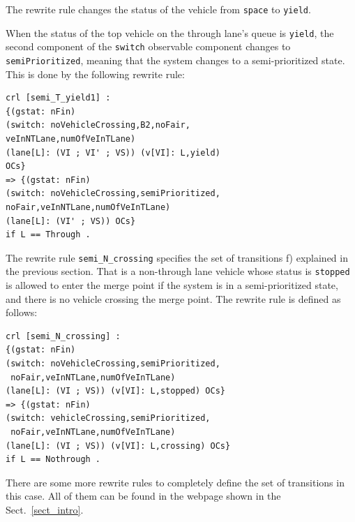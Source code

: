 \documentclass[10pt, conference, compsocconf]{IEEEtran}
\begin{document}
\noindent
The rewrite rule changes
the status of the vehicle from \verb!space! to \verb!yield!.

When the status of the top vehicle on the through lane's queue is \verb!yield!, the second component of the \verb!switch! observable component changes to \verb!semiPrioritized!, meaning that the system changes to a semi-prioritized state.
This is done by the following rewrite rule:

\begin{small}
\begin{verbatim}
crl [semi_T_yield1] : 
{(gstat: nFin) 
(switch: noVehicleCrossing,B2,noFair,
veInNTLane,numOfVeInTLane) 
(lane[L]: (VI ; VI' ; VS)) (v[VI]: L,yield) 
OCs} 
=> {(gstat: nFin) 
(switch: noVehicleCrossing,semiPrioritized,
noFair,veInNTLane,numOfVeInTLane) 
(lane[L]: (VI' ; VS)) OCs} 
if L == Through .
\end{verbatim}
\end{small}

The rewrite rule \verb!semi_N_crossing! specifies the set of transitions f) explained in the previous section.
That is a non-through lane vehicle whose status is \verb!stopped! is allowed to enter the merge point
if the system is in a semi-prioritized state, and there is no vehicle crossing the merge point. 
The rewrite rule is defined as follows:

\begin{small}
\begin{verbatim}
crl [semi_N_crossing] : 
{(gstat: nFin) 
(switch: noVehicleCrossing,semiPrioritized,
 noFair,veInNTLane,numOfVeInTLane) 
(lane[L]: (VI ; VS)) (v[VI]: L,stopped) OCs} 
=> {(gstat: nFin) 
(switch: vehicleCrossing,semiPrioritized,
 noFair,veInNTLane,numOfVeInTLane) 
(lane[L]: (VI ; VS)) (v[VI]: L,crossing) OCs}
if L == Nothrough .
\end{verbatim}
\end{small}

There are some more rewrite rules to completely define the set of transitions in this case.
All of them can be found in the webpage shown in the Sect.~\ref{sect_intro}.
\end{document}
